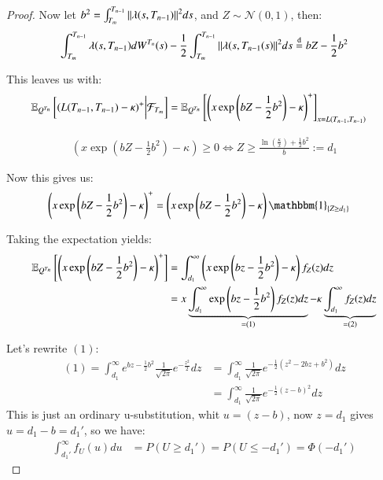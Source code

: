 \begin{proof}
Now let $b^{2} = \int_{T_{m}}^{T_{n-1}}\norm{\lambda(s,T_{n-1})}^{2}ds$, and $Z \sim \mathcal{N}(0,1)$, then: 
\begin{align*}
\int_{T_{m}}^{T_{n-1}}\lambda(s, T_{n-1})dW^{T_{n}}(s)
-\frac{1}{2}\int_{T_{m}}^{T_{n-1}}\norm{\lambda(s, T_{n-1}(s)}^{2}ds 
\stackrel{\text{d}}{=} bZ - \frac{1}{2}b^{2}
\end{align*}


This leaves us with: 
\begin{align*}
\mathbb{E}_{Q^{T_{n}}}\left[
(L(T_{n-1}, T_{n-1}) - \kappa)^{+}
\bigg{|}\mathcal{F}_{T_{m}}
\right]
&= 
\mathbb{E}_{Q^{T_{n}}}\left[
\left(x\exp\left(bZ-\frac{1}{2}b^{2}\right) - \kappa
\right)^{+}
\right]_{x = L(T_{n-1}, T_{n-1})}
\end{align*}

\newpage 

\begin{align*}
\left(x\exp\left(bZ-\frac{1}{2}b^{2}\right) - \kappa\right) 
\geq 0 \iff 
Z \geq 
\frac{
\ln\left(\frac{\kappa}{x}\right) + \frac{1}{2}b^{2}
}{
b
}:= d_{1}
\end{align*}

Now this gives us: 
\begin{align*}
\left(x\exp\left(bZ-\frac{1}{2}b^{2}\right) - \kappa
\right)^{+}
&= 
\left(x\exp\left(bZ-\frac{1}{2}b^{2}\right) - \kappa
\right)\mathbbm{1}_{\{Z\geq d_{1}\}}
\end{align*}

Taking the expectation yields: 
\begin{align*}
\mathbb{E}_{Q^{T_{n}}}\left[
\left(x\exp\left(bZ-\frac{1}{2}b^{2}\right) - \kappa
\right)^{+}
\right] &= 
\int_{d_{1}}^{\infty}\left(
x\exp\left(bz-\frac{1}{2}b^{2}
\right) - \kappa
\right)f_{Z}(z)dz \\ 
&= x
\underbrace{
\int_{d_{1}}^{\infty}\exp\left(bz-\frac{1}{2}b^{2}\right)f_{Z}(z)dz 
}_{=(1)}
-\kappa
\underbrace{
\int_{d_{1}}^{\infty}f_{Z}(z)dz
}_{= (2)}
\end{align*}

Let's rewrite $(1)$:
\begin{align*}
(1) = 
\int_{d_{1}}^{\infty}e^{
bz-\frac{1}{2}b^{2}
}\frac{1}{\sqrt{2\pi}}e^{-\frac{z^{2}}{2}}dz   
&= 
\int_{d_{1}}^{\infty}\frac{1}{\sqrt{2\pi}}e^{
-\frac{1}{2}\left(
z^{2} - 2bz + b^{2}
\right)}
dz\\ 
&= 
\int_{d_{1}}^{\infty}\frac{1}{\sqrt{2\pi}}e^{
-\frac{1}{2}\left(
z - b
\right)^{2}}
dz
\end{align*}
This is just an ordinary u-substitution, whit $u = (z-b)$, now 
$z = d_{1}$ gives $u = d_{1}-b = d_{1}'$, so we have: 
\begin{align*}
\int_{d_{1}'}^{\infty}f_{U}(u)du &= P(U\geq d_{1}') 
= P(U\leq -d_{1}') = \Phi(-d_{1}')
\end{align*}


\end{proof}

